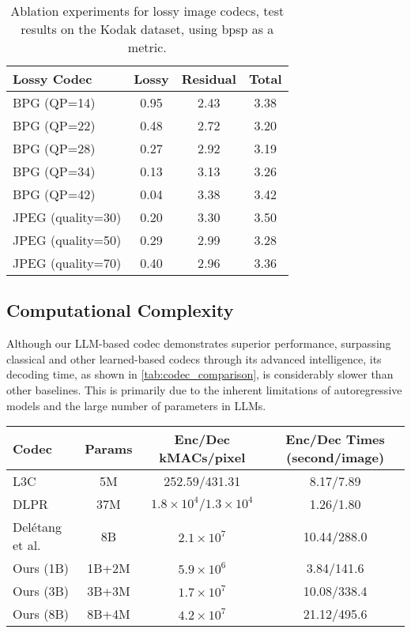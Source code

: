 \begin{table}[t]
    \centering
    \begin{tabular}{lccc}
        \toprule[2pt]
        Lossy Codec &Lossy &Residual &Total\\
        \midrule[1pt]
        BPG (QP=14)  &0.95 &2.43 &3.38\\
        BPG (QP=22)  &0.48 &2.72 &3.20\\
        BPG (QP=28)  &0.27 &2.92 &3.19\\
        BPG (QP=34)  &0.13 &3.13 &3.26\\
        BPG (QP=42)  &0.04 &3.38 &3.42\\
        \midrule[1pt]
        JPEG (quality=30)         & 0.20           & 3.30              & 3.50           \\ 
JPEG (quality=50)         & 0.29           & 2.99              & 3.28           \\ 
JPEG (quality=70)         & 0.40           & 2.96              & 3.36           \\ 
        \bottomrule[2pt]
    \end{tabular}
    \caption{Ablation experiments for lossy image codecs, test results on the Kodak dataset, using bpsp as a metric.}
    \label{tab:lossy_codecs}
\end{table}

\subsection{Computational Complexity}\label{sec:complexity}

Although our LLM-based codec demonstrates superior performance, surpassing classical and other learned-based codecs through its advanced intelligence, its decoding time, as shown in \cref{tab:codec_comparison}, is considerably slower than other baselines. This is primarily due to the inherent limitations of autoregressive models and the large number of parameters in LLMs.

\begin{table*}[t]
    \centering
    \tabcolsep=0.5cm
    \begin{tabular}{lccc}
        \toprule[2pt]
        Codec & Params & Enc/Dec kMACs/pixel & Enc/Dec Times (second/image)\\ 
        \midrule[1pt]
        L3C~\cite{mentzer2019practical} & 5M & 252.59/431.31 &8.17/7.89\\
        DLPR~\cite{bai2024deep} & 37M & $1.8\times10^4/1.3\times10^4$ & 1.26/1.80\\
        \midrule[1pt]
        Del{\'e}tang et al.~\cite{deletang2023language} & 8B & $2.1\times10^7$ & 10.44/288.0 \\ 
        Ours (1B) & 1B+2M & $5.9\times10^6$ & 3.84/141.6 \\ 
        Ours (3B) & 3B+3M & $1.7\times10^7$ & 10.08/338.4 \\ 
        Ours (8B) & 8B+4M & $4.2\times10^7$ & 21.12/495.6 \\ 
        \bottomrule[2pt]
    \end{tabular}
    \caption{Comparison of runtimes and kMACs on Kodak dataset.}
    \label{tab:codec_comparison}
\end{table*}

